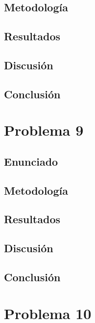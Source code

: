 \documentclass{article}
\begin{document}
\subsection{Metodología}

\subsection{Resultados}
\setcounter{equation}{0}

\subsection{Discusión}

\subsection{Conclusión}

\section{Problema 9}

\subsection{Enunciado}

\subsection{Metodología}

\subsection{Resultados}
\setcounter{equation}{0}

\subsection{Discusión}

\subsection{Conclusión}

\section{Problema 10}
\end{document}

